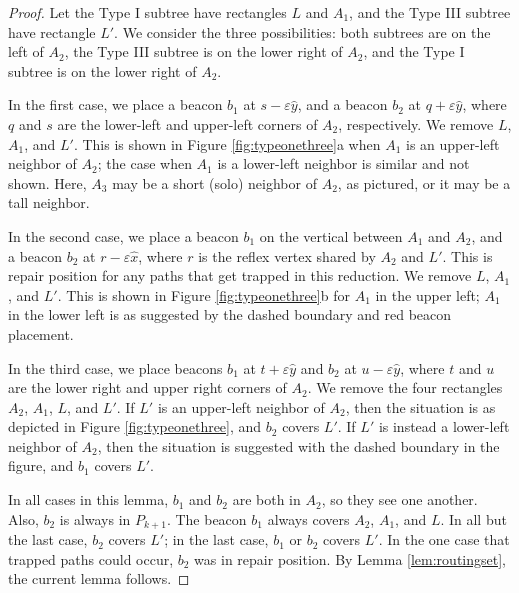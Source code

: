 \documentclass{article}
\begin{document}
		\begin{proof}
			Let the Type I subtree have rectangles $L$ and $A_1$, 
			and the Type III subtree have rectangle $L'$.
			We consider the three possibilities:
			both subtrees are on the left of $A_2$,
			the Type III subtree is on the lower right of $A_2$,
			and the Type I subtree is on the lower right of $A_2$.
			
			In the first case, we place a beacon $b_1$ at $s - \varepsilon\hat{y}$,
			and a beacon $b_2$ at $q + \varepsilon\hat{y}$,
			where $q$ and $s$ are the lower-left and upper-left corners of $A_2$,
			respectively.
			We remove $L$, $A_1$, and $L'$.  This is shown in Figure
			\ref{fig:typeonethree}a when $A_1$ is an upper-left neighbor of $A_2$; the
			case when $A_1$ is a lower-left neighbor is similar and not shown.  Here,
			$A_3$ may be a short (solo) neighbor of $A_2$, as pictured, or it may be a
			tall neighbor.
			
			In the second case, we place a beacon $b_1$ on the vertical between 
			$A_1$ and $A_2$, and a beacon $b_2$ at $r-\varepsilon\hat{x}$,
			where $r$ is the reflex vertex shared by $A_2$ and $L'$.
			This is repair position for any paths that get trapped in this reduction.
			We remove $L$, $A_1$, and $L'$. 
			This is shown in Figure \ref{fig:typeonethree}b for $A_1$ in the upper left;
			$A_1$ in the lower left is as suggested by the dashed boundary and red
			beacon placement.
			
			In the third case, we place beacons $b_1$ at $t + \varepsilon\hat{y}$ and
			$b_2$ at $u - \varepsilon\hat{y}$, where $t$ and $u$ are the lower right and
			upper right corners of $A_2$.  We remove the four rectangles $A_2$,
			$A_1$, $L$, and $L'$.
			If $L'$ is an upper-left neighbor of $A_2$, then the situation is as depicted
			in Figure \ref{fig:typeonethree}, and $b_2$ covers $L'$.
			If $L'$ is instead a lower-left neighbor of $A_2$, then the situation is
			suggested with the dashed boundary in the figure, and $b_1$ covers $L'$.
						
			In all cases in this lemma, $b_1$ and $b_2$ are both in $A_2$, so they see
			one another.
			Also, $b_2$ is always in $P_{k+1}$.
			The beacon $b_1$ always covers $A_2$, $A_1$, and $L$.
			In all but the last case, $b_2$ covers $L'$; in the last case,
			$b_1$ or $b_2$ covers $L'$.
			In the one case that trapped paths could occur, $b_2$ was in repair position.
			By Lemma \ref{lem:routingset}, the current lemma follows.
		\end{proof}
		
\end{document}
